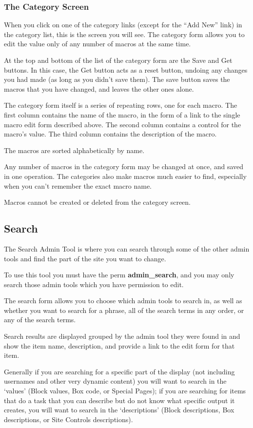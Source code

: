 \subsubsection{The Category Screen}

When you click on one of the category links (except for the ``Add New'' link) in the category list, this is the screen you will see.  The category form allows you to edit the value only of any number of macros at the same time.

At the top and bottom of the list of the category form are the Save and Get buttons.  In this case, the Get button acts as a reset button, undoing any changes you had made (as long as you didn't save them).  The save button saves the macros that you have changed, and leaves the other ones alone.

The category form itself is a series of repeating rows, one for each macro.  The first column contains the name of the macro, in the form of a link to the single macro edit form described above.  The second column contains a control for the macro's value.  The third column contains the description of the macro.

The macros are sorted alphabetically by name.

Any number of macros in the category form may be changed at once, and saved in one operation.  The categories also make macros much easier to find, especially when you can't remember the exact macro name.

Macros cannot be created or deleted from the category screen.


\subsection{Search}
\label{admin-tools-search}

The Search Admin Tool is where you can search through some of the other admin tools and find the part of the site you want to change.

To use this tool you must have the perm {\bf admin\_search}, and you may only search those admin tools which you have permission to edit.

The search form allows you to choose which admin tools to search in, as well as whether you want to search for a phrase, all of the search terms in any order, or any of the search terms.

Search results are displayed grouped by the admin tool they were found in and show the item name, description, and provide a link to the edit form for that item.

Generally if you are searching for a specific part of the display (not including usernames and other very dynamic content) you will want to search in the `values' (Block values, Box code, or Special Pages); if you are searching for items that do a task that you can describe but do not know what specific output it creates, you will want to search in the `descriptions' (Block descriptions, Box descriptions, or Site Controls descriptions).

